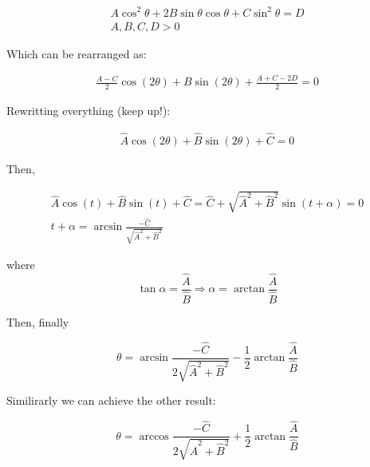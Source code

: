 \documentclass{article}
\begin{document}
\begin{eqnarray}
A\cos^2{\theta} + 2B\sin{\theta}\cos{\theta} + C\sin^2{\theta} = D\\
A,B,C,D > 0
\end{eqnarray}

Which can be rearranged as:

\begin{eqnarray*}
\frac{A-C}{2}\cos{(2\theta)} + B\sin{(2\theta)} + \frac{A+C-2D}{2} = 0
\end{eqnarray*}

Rewritting everything (keep up!):

\begin{eqnarray*}
\hat{A} \cos{(2\theta)} + \hat{B}\sin{(2\theta)} + \hat{C} = 0
\end{eqnarray*}

Then,

\begin{eqnarray}
\hat{A} \cos{(t)} + \hat{B}\sin{(t)} + \hat{C} = \hat{C} + \sqrt{\hat{A}^2 + \hat{B}^2} \sin{(t+\alpha)} = 0\\
t + \alpha = \arcsin{\frac{-\hat{C}}{\sqrt{\hat{A}^2 + \hat{B}^2}}}
\end{eqnarray}

where $$\tan{\alpha} = \frac{\hat{A}}{\hat{B}} \Rightarrow \alpha = \arctan{\frac{\hat{A}}{\hat{B}}}$$

Then, finally

\begin{equation}
	\theta = \arcsin{\frac{-\hat{C}}{2\sqrt{\hat{A}^2 + \hat{B}^2}}} - \frac{1}{2}\arctan{\frac{\hat{A}}{\hat{B}}}
\end{equation}

Similirarly we can achieve the other result:

\begin{equation}
\theta = \arccos{\frac{-\hat{C}}{2\sqrt{\hat{A}^2 + \hat{B}^2}}} + \frac{1}{2}\arctan{\frac{\hat{A}}{\hat{B}}}
\end{equation}
	
	
\end{document}
